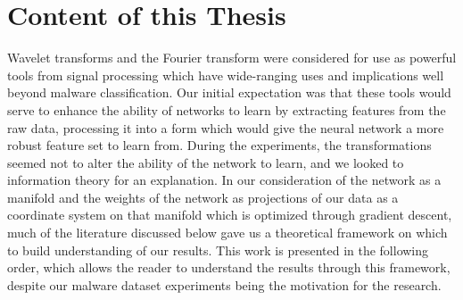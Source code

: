 \section{Content of this Thesis}
Wavelet transforms and the Fourier transform were considered for use as powerful tools from signal processing which have wide-ranging uses and implications well beyond malware classification.
Our initial expectation was that these tools would serve to enhance the ability of networks to learn by extracting features from the raw data, processing it into a form which would give the neural network a more robust feature set to learn from.
During the experiments, the transformations seemed not to alter the ability of the network to learn, and we looked to information theory for an explanation. 
In our consideration of the network as a manifold and the weights of the network as projections of our data as a coordinate system on that manifold which is optimized through gradient descent, much of the literature discussed below gave us a theoretical framework on which to build understanding of our results. 
This work is presented in the following order, which allows the reader to understand the results through this framework, despite our malware dataset experiments being the motivation for the research.
